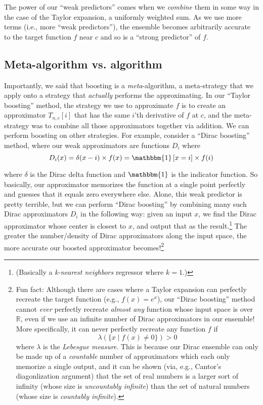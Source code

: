 \documentclass[letterpaper,12pt]{report}
\begin{document}
The power of our ``weak predictors'' comes when we \emph{combine} them in some way 
\textemdash{} in the case of the Taylor expansion, a uniformly weighted sum. 
As we use more terms (i.e., more ``weak predictors''),
the ensemble becomes arbitrarily accurate to the target function \(f\) near \(c\) and so is
a ``strong predictor'' of \(f\).



\subsection{Meta-algorithm vs. algorithm}\label{meta-algorithm-vs-algorithm}

Importantly, we said that boosting is a \emph{meta}-algorithm, a meta-strategy that we
apply onto a strategy that \emph{actually} performs the approximating. 
In our ``Taylor boosting'' method, the strategy we use to approximate \(f\) is to create an
approximator \(T_{n,c}[i]\) that has the same \(i\)'th derivative of \(f\) at \(c\), and the
meta-strategy was to combine all those approximators together via addition. We can perform
boosting on other strategies. For example, consider a ``Dirac boosting'' method, where our
weak approximators are functions \(D_i\) where
\[D_i(x) = \delta(x-i) \times f(x) = \mathbbm{1}\left[x = i\right] \times f(i) \]

where \(\delta\) is the Dirac delta function and \(\mathbbm{1}\) is the indicator function.
So basically, our approximator memorizes the function at a single point perfectly and guesses 
that it equals zero everywhere else. Alone, this weak predictor is pretty terrible, but
we can perform ``Dirac boosting'' by combining many such Dirac approximators \(D_i\) in the
following way: given an input \(x\), we find the Dirac approximator whose center is closest
to \(x\), and output that as the result.\footnote{
  (Basically a \emph{k-nearest neighbors} regressor where \(k=1\).)
} 
The greater the number/density of Dirac approximators along the input space,
the more accurate our boosted approximator becomes!\footnote{
  Fun fact: Although there are cases where a Taylor expansion can perfectly recreate the
  target function (e.g., \(f(x) = e^x\)), our ``Dirac boosting'' method cannot \emph{ever}
  perfectly recreate \emph{almost any} function whose input space is over \(\mathbb{R}\), even if
  we use an infinite number of Dirac approximators in our ensemble! More specifically,
  it can never perfectly recreate any function \(f\) if
  \[\lambda\left(\{x \mid f(x) \neq 0\}\right) > 0\]
  where \(\lambda\) is the \emph{Lebesgue measure}.
  This is because 
  our Dirac ensemble can only be made up of a \emph{countable} number of approximators which
  each only memorize a single output, and it can be shown (via, e.g., Cantor's diagonlization
  argument) that the set of real numbers is a larger sort of infinity
  (whose size is 
  \emph{uncountably infinite}) 
  than the set of natural numbers (whose size is
  \emph{countably infinite}).
}
\end{document}
